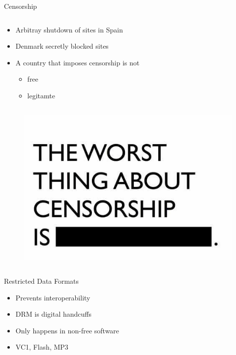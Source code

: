 \begin{frame}{Censorship}
  \begin{column}{0.45\textwidth}
    \begin{itemize}
      \item Arbitray shutdown of sites in Spain
      \item Denmark secretly blocked sites
      \item A country that imposes censorship is not
        \begin{itemize}
          \item free
          \item legitamte
        \end{itemize}
    \end{itemize}
  \end{column}
  \begin{column}{0.5\textwidth}\raggedleft{}
    \begin{figure}
      \includegraphics[width=\textwidth]{images/censorship.jpg}
      \caption{\Protect\cite{censorship}}
    \end{figure}
  \end{column}
\end{frame}

\begin{frame}{Restricted Data Formats}
  \begin{itemize}
    \item Prevents interoperability
    \item DRM is digital handcuffs
    \item Only happens in non-free software
    \item VC1, Flash, MP3
  \end{itemize}
\end{frame}

